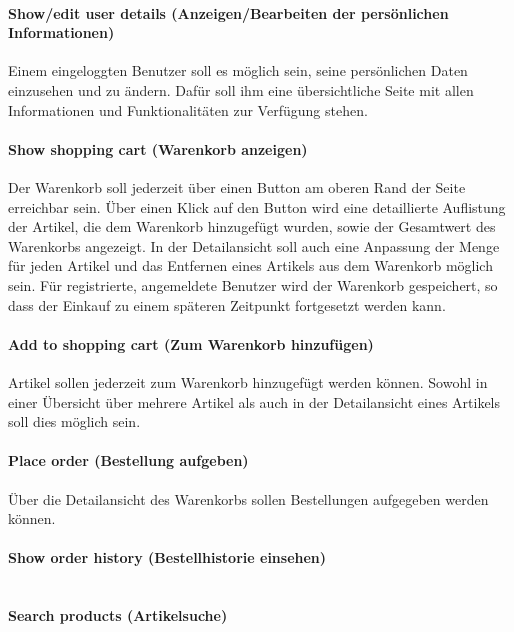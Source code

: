 \paragraph{Show/edit user details (Anzeigen/Bearbeiten der persönlichen Informationen)}$\;$ \\
Einem eingeloggten Benutzer soll es möglich sein, seine persönlichen Daten einzusehen und zu ändern.
Dafür soll ihm eine übersichtliche Seite mit allen Informationen und Funktionalitäten zur Verfügung stehen.

\paragraph{Show shopping cart (Warenkorb anzeigen)}$\;$ \\
Der Warenkorb soll jederzeit über einen Button am oberen Rand der Seite erreichbar sein.
Über einen Klick auf den Button wird eine detaillierte Auflistung der Artikel, die dem Warenkorb hinzugefügt wurden, sowie der Gesamtwert des Warenkorbs angezeigt.
In der Detailansicht soll auch eine Anpassung der Menge für jeden Artikel und das Entfernen eines Artikels aus dem Warenkorb möglich sein.
Für registrierte, angemeldete Benutzer wird der Warenkorb gespeichert, so dass der Einkauf zu einem späteren Zeitpunkt fortgesetzt werden kann.
\paragraph{Add to shopping cart (Zum Warenkorb hinzufügen)}$\;$ \\
Artikel sollen jederzeit zum Warenkorb hinzugefügt werden können. Sowohl in einer Übersicht über mehrere Artikel als auch in der Detailansicht eines Artikels soll dies möglich sein.
\paragraph{Place order (Bestellung aufgeben)}$\;$ \\
Über die Detailansicht des Warenkorbs sollen Bestellungen aufgegeben werden können.
\paragraph{Show order history (Bestellhistorie einsehen)}$\;$ \\
\paragraph{Search products (Artikelsuche)}$\;$ \\
